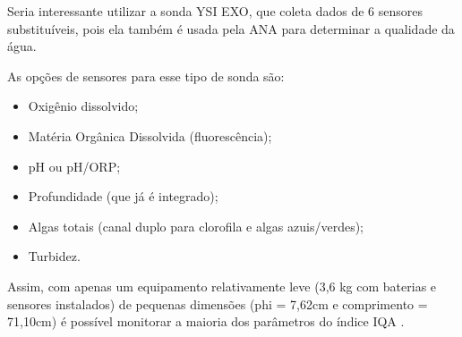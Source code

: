 Seria interessante utilizar a sonda YSI EXO, que coleta dados de 6 sensores substituíveis, pois ela também é usada pela ANA para determinar a qualidade da água.

As opções de sensores para esse tipo de sonda são:

\begin{itemize}
 \item Oxigênio dissolvido;
 \item Matéria Orgânica Dissolvida (fluorescência);
 \item pH ou pH/ORP;
 \item Profundidade (que já é integrado);
 \item Algas totais (canal duplo para clorofila e algas azuis/verdes);
 \item Turbidez.
\end{itemize}

Assim, com apenas um equipamento relativamente leve (3,6 kg com baterias e sensores instalados) de pequenas
dimensões (phi = 7,62cm e comprimento = 71,10cm) é possível monitorar a maioria dos parâmetros do índice IQA \cite{cleanEnvironmentBrasil}.






